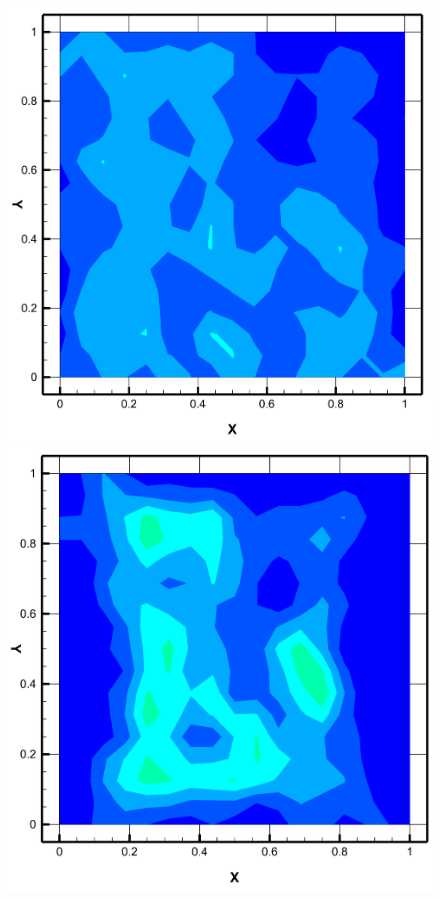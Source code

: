 \begin{figure}
    \centering
    \quad
  \begin{minipage}[b]{0.45\textwidth}
    \includegraphics[width=\textwidth]{figures/Ambi1.png}
  \end{minipage} %
  \begin{minipage}[b]{0.45\textwidth}
    \includegraphics[width=\textwidth]{figures/Ambi2.png}

\end{minipage}
\end{figure}
